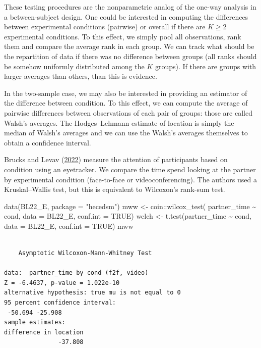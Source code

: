 \documentclass[
  11pt,
  letterpaper,
]{scrbook}
\newenvironment{Shaded}{\begin{snugshade}}{\end{snugshade}}
\newcommand{\AttributeTok}[1]{\textcolor[rgb]{0.40,0.45,0.13}{#1}}
\newcommand{\ConstantTok}[1]{\textcolor[rgb]{0.56,0.35,0.01}{#1}}
\newcommand{\FunctionTok}[1]{\textcolor[rgb]{0.28,0.35,0.67}{#1}}
\newcommand{\NormalTok}[1]{\textcolor[rgb]{0.00,0.23,0.31}{#1}}
\newcommand{\OtherTok}[1]{\textcolor[rgb]{0.00,0.23,0.31}{#1}}
\newcommand{\SpecialCharTok}[1]{\textcolor[rgb]{0.37,0.37,0.37}{#1}}
\newcommand{\StringTok}[1]{\textcolor[rgb]{0.13,0.47,0.30}{#1}}
\theoremstyle{definition}
\theoremstyle{remark}
\begin{document}
These testing procedures are the nonparametric analog of the one-way
analysis in a between-subject design. One could be interested in
computing the differences between experimental conditions (pairwise) or
overall if there are \(K \geq 2\) experimental conditions. To this
effect, we simply pool all observations, rank them and compare the
average rank in each group. We can track what should be the repartition
of data if there was no difference between groups (all ranks should be
somehow uniformly distributed among the \(K\) groups). If there are
groups with larger averages than others, than this is evidence.

In the two-sample case, we may also be interested in providing an
estimator of the difference between condition. To this effect, we can
compute the average of pairwise differences between observations of each
pair of groups: those are called Walsh's averages. The Hodges--Lehmann
estimate of location is simply the median of Walsh's averages and we can
use the Walsh's averages themselves to obtain a confidence interval.

Brucks and Levav (\protect\hyperlink{ref-Brucks.Levav:2022}{2022})
measure the attention of participants based on condition using an
eyetracker. We compare the time spend looking at the partner by
experimental condition (face-to-face or videoconferencing). The authors
used a Kruskal--Wallis test, but this is equivalent to Wilcoxon's
rank-sum test.

\begin{Shaded}
\begin{Highlighting}[]
\FunctionTok{data}\NormalTok{(BL22\_E, }\AttributeTok{package =} \StringTok{"hecedsm"}\NormalTok{)}
\NormalTok{mww }\OtherTok{\textless{}{-}}\NormalTok{ coin}\SpecialCharTok{::}\FunctionTok{wilcox\_test}\NormalTok{(}
\NormalTok{  partner\_time }\SpecialCharTok{\textasciitilde{}}\NormalTok{ cond, }
  \AttributeTok{data =}\NormalTok{ BL22\_E, }
  \AttributeTok{conf.int =} \ConstantTok{TRUE}\NormalTok{)}
\NormalTok{welch }\OtherTok{\textless{}{-}} \FunctionTok{t.test}\NormalTok{(partner\_time }\SpecialCharTok{\textasciitilde{}}\NormalTok{ cond, }
  \AttributeTok{data =}\NormalTok{ BL22\_E, }
  \AttributeTok{conf.int =} \ConstantTok{TRUE}\NormalTok{)}
\NormalTok{mww}
\end{Highlighting}
\end{Shaded}

\begin{verbatim}

    Asymptotic Wilcoxon-Mann-Whitney Test

data:  partner_time by cond (f2f, video)
Z = -6.4637, p-value = 1.022e-10
alternative hypothesis: true mu is not equal to 0
95 percent confidence interval:
 -50.694 -25.908
sample estimates:
difference in location 
               -37.808 
\end{verbatim}
\end{document}
